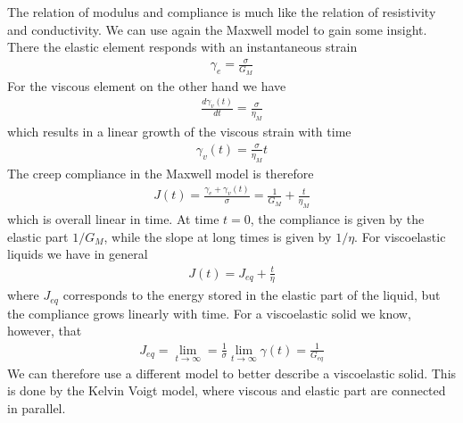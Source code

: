 \documentclass[letterpaper,10pt,english]{sphinxmanual}
\begin{document}
\sphinxAtStartPar
The relation of modulus and compliance is much like the relation of resistivity and conductivity. We can use again the Maxwell model to gain some insight. There the elastic element responds with an instantaneous strain
\begin{equation*}
\begin{split}\gamma_e=\frac{\sigma}{G_M}\end{split}
\end{equation*}
\sphinxAtStartPar
For the viscous element on the other hand we have
\begin{equation*}
\begin{split}\frac{d\gamma_v(t)}{dt}=\frac{\sigma}{\eta_M}\end{split}
\end{equation*}
\sphinxAtStartPar
which results in a linear growth of the viscous strain with time
\begin{equation*}
\begin{split}\gamma_v(t)=\frac{\sigma}{\eta_M}t\end{split}
\end{equation*}
\sphinxAtStartPar
The creep compliance in the Maxwell model is therefore
\begin{equation*}
\begin{split}J(t)=\frac{\gamma_e+\gamma_v(t)}{\sigma}=\frac{1}{G_M}+\frac{t}{\eta_M}\end{split}
\end{equation*}
\sphinxAtStartPar
which is overall linear in time. At time \(t=0\), the compliance is given by the elastic part \(1/G_M\), while the slope at long times is given by \(1/\eta\). For viscoelastic liquids we have in general
\begin{equation*}
\begin{split}J(t)=J_{eq}+\frac{t}{\eta}\end{split}
\end{equation*}
\sphinxAtStartPar
where \(J_{eq}\) corresponds to the energy stored in the elastic part of the liquid, but the compliance grows linearly with time. For a viscoelastic solid we know, however, that
\begin{equation*}
\begin{split}J_{eq}=\lim_{t\rightarrow \infty}=\frac{1}{\sigma}\lim_{t\rightarrow \infty}\gamma(t)=\frac{1}{G_{eq}}\end{split}
\end{equation*}
\sphinxAtStartPar
We can therefore use a different model to better describe a viscoelastic solid. This is done by the Kelvin Voigt model, where viscous and elastic part are connected in parallel.
\end{document}
